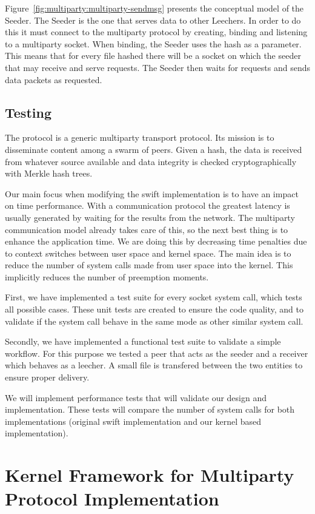 Figure~\ref{fig:multiparty:multiparty-sendmsg} presents the conceptual model
of the Seeder. The Seeder is the one that serves data to other Leechers. In
order to do this it must connect to the multiparty protocol by creating,
binding and listening to a multiparty socket. When binding, the Seeder
uses the hash as a parameter. This means that for every file hashed there will
be a socket on which the seeder that may receive and serve requests. The Seeder
then waits for requests and sends data packets as requested.

\subsection{Testing}

The  protocol is a generic multiparty transport protocol. Its mission is to
disseminate content among a swarm of peers.  Given a hash, the data is
received from whatever source available and data integrity is checked
cryptographically with Merkle hash trees. 

Our main focus when modifying the swift implementation is to have an impact on
time performance. With a communication protocol the greatest latency is
usually generated by waiting for the results from the network. The multiparty
communication model already takes care of this, so the next best thing is to
enhance the application time. We are doing this by decreasing time
penalties due to context switches between user space and kernel space. The
main idea is to reduce the number of system calls made from user space into
the kernel. This implicitly reduces the number of preemption moments.

First, we have implemented a test suite for every socket system call, which
tests all possible cases. These unit tests are created to ensure the code
quality, and to validate if the system call behave in the same mode as other
similar system call.

Secondly, we have implemented a functional test suite to validate a simple
workflow. For this purpose we tested a peer that acts as the seeder and a
receiver which behaves as a leecher. A small file is transfered between the
two entities to ensure proper delivery.

We will implement performance tests that will validate our design and
implementation. These tests will compare the number of system calls for both
implementations (original swift implementation and our kernel based
implementation).

\section{Kernel Framework for Multiparty Protocol Implementation}
\label{sec:multiparty:kernel-framework}

